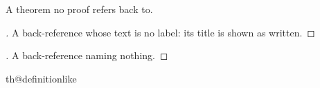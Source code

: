 \begin{theorem}\flmLabels{\label{ref1}}
A theorem no proof refers back to.
\end{theorem}

\begin{proof}[{}]
A back-reference whose text is no label: its title is shown as written.
\end{proof}

\begin{proof}[{}]
A back-reference naming nothing.
\end{proof}%
\RequirePackage{amsthm}
\RequirePackage{zref-clever}
\ProvideDocumentCommand\noproofref{}{}
\ifcsname th@definitionlike\endcsname\else{}\fi
\ProvideDocumentCommand{}
%
%
